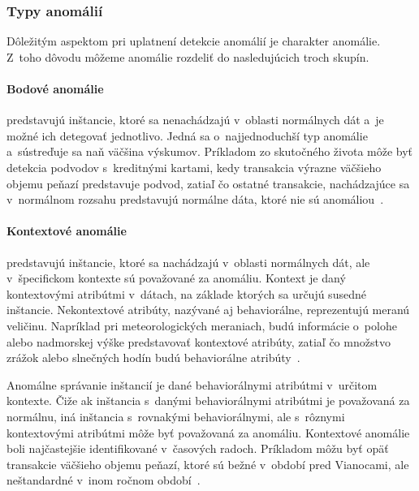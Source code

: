 \documentclass[a4paper,twoside,slovak,12pt,appendix]{article}
\begin{document}

\subsubsection{Typy anomálií}
Dôležitým aspektom pri uplatnení detekcie anomálií je charakter anomálie. Z~toho
dôvodu môžeme anomálie rozdeliť do nasledujúcich troch skupín.

\paragraph{Bodové anomálie} predstavujú inštancie, ktoré sa nenachádzajú
v~oblasti normálnych dát a~je možné ich detegovať jednotlivo. Jedná sa
o~najjednoduchší typ anomálie a~sústreďuje sa naň väčšina výskumov. Príkladom zo
skutočného života môže byť detekcia podvodov s~kreditnými kartami, kedy
transakcia výrazne väčšieho objemu peňazí predstavuje podvod, zatiaľ čo ostatné
transakcie, nachádzajúce sa v~normálnom rozsahu predstavujú normálne dáta, ktoré
nie sú anomáliou~\cite{Chandola2009}.

\paragraph{Kontextové anomálie} predstavujú inštancie, ktoré sa nachádzajú
v~oblasti normálnych dát, ale v~špecifickom kontexte sú považované za anomáliu.
Kontext je daný kontextovými atribútmi v~dátach, na základe ktorých sa určujú
susedné inštancie. Nekontextové atribúty, nazývané aj behaviorálne, reprezentujú
meranú veličinu. Napríklad pri meteorologických meraniach, budú informácie
o~polohe alebo nadmorskej výške predstavovať kontextové atribúty, zatiaľ čo
množstvo zrážok alebo slnečných hodín budú behaviorálne
atribúty~\cite{Chandola2009}.

Anomálne správanie inštancií je dané behaviorálnymi atribútmi v~určitom kontexte.
Čiže ak inštancia s~danými behaviorálnymi atribútmi je považovaná za normálnu,
iná inštancia s~rovnakými behaviorálnymi, ale s~rôznymi kontextovými atribútmi
môže byť považovaná za anomáliu. Kontextové anomálie boli najčastejšie
identifikované v~časových radoch. Príkladom môžu byť opäť transakcie väčšieho
objemu peňazí, ktoré sú bežné v~období pred Vianocami, ale neštandardné v~inom
ročnom období~\cite{Chandola2009}.
\end{document}
